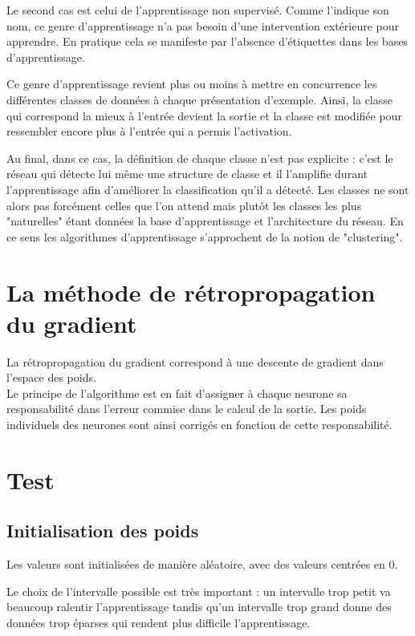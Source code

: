 \documentclass[a4paper,oneside]{report}
\begin{document}
                Le second cas est celui de l'apprentissage non supervisé. Comme l'indique son nom, ce genre d'apprentissage n'a pas besoin d'une intervention extérieure pour apprendre. En pratique cela se manifeste par l'absence d'étiquettes dans les bases d'apprentissage.

                Ce genre d'apprentissage revient plus ou moins à mettre en concurrence les différentes classes de données à chaque présentation d'exemple. Ainsi, la classe qui correspond la mieux à l'entrée devient la sortie et la classe est modifiée pour ressembler encore plus à l'entrée qui a permis l'activation.

                Au final, dans ce cas, la définition de chaque classe n'est pas explicite : c'est le réseau qui détecte lui même une structure de classe et il l'amplifie durant l'apprentissage afin d'améliorer la classification qu'il a détecté. Les classes ne sont alors pas forcément celles que l'on attend mais plutôt les classes les plus "naturelles" étant données la base d'apprentissage et l'architecture du réseau. En ce sens les algorithmes d'apprentissage s'approchent de la notion de "clustering".


            \section{La méthode de rétropropagation du gradient}

                La rétropropagation du gradient correspond à une descente de gradient dans l'espace des poids.\\

                Le principe de l'algorithme est en fait d'assigner à chaque neurone sa responsabilité dans l'erreur commise dans le calcul de la sortie. Les poids individuels des neurones sont ainsi corrigés en fonction de cette responsabilité.
                \section{Test}


                \subsection{Initialisation des poids}

                    Les valeurs sont initialisées de manière aléatoire, avec des valeurs centrées en 0.

                    Le choix de l'intervalle possible est très important : un intervalle trop petit va beaucoup ralentir l'apprentissage tandis qu'un intervalle trop grand donne des données trop éparses qui rendent plus difficile l'apprentissage.
\end{document}
